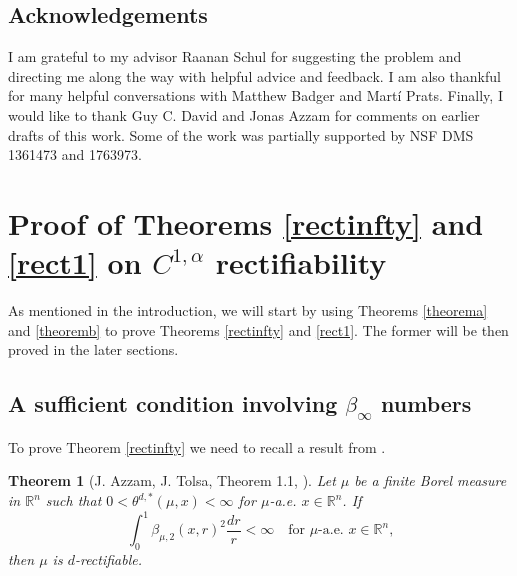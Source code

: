 \documentclass[11pt, twoside, leqno]{article}
\numberwithin{equation}{section}
\theoremstyle{plain}
\newtheorem{thm}{Theorem}[section]
\theoremstyle{definition}
\newcommand{\R}{\mathbb{R}}
\newcommand{\dist}{\operatorname{dist}}
\begin{document}
\subsection{Acknowledgements}

I am grateful to my advisor Raanan Schul for suggesting the problem and directing me along the way with helpful advice and feedback. I am also thankful for many helpful conversations with Matthew Badger and Mart\'i Prats. Finally, I would like to thank Guy C. David and Jonas Azzam for comments on earlier drafts of this work. %
Some of the work was partially supported by NSF DMS 1361473 and 1763973.

\section{Proof of Theorems \ref{rectinfty} and \ref{rect1} on \texorpdfstring{$C^{1,\alpha}$}{C1alpha} rectifiability} \label{rect}

As mentioned in the introduction, we will start by using Theorems \ref{theorema} and \ref{theoremb} to prove Theorems \ref{rectinfty} and \ref{rect1}. The former will be then proved in the later sections.

 \subsection{A sufficient condition involving \texorpdfstring{$\beta_{\infty}$}{Binfty} numbers}


To prove Theorem \ref{rectinfty} we need to recall a result from \cite{ATII}. %


\begin{thm}[J. Azzam, J. Tolsa, Theorem 1.1,  \cite{ATII}] \label{azzamtolsa}
Let $\mu$ be a finite Borel measure in $\R^n$ such that $0<\theta^{d,*}(\mu,x) < \infty$ for $\mu$-a.e. $x \in \R^n$. If 
\begin{equation}
\int_0^1\beta_{\mu,2}(x,r)^2 \frac{dr}{r} < \infty \quad \text{for $\mu$-a.e. $x \in \R^n$,}
\end{equation}
then $\mu$ is $d$-rectifiable.
\end{thm}
\end{document}
